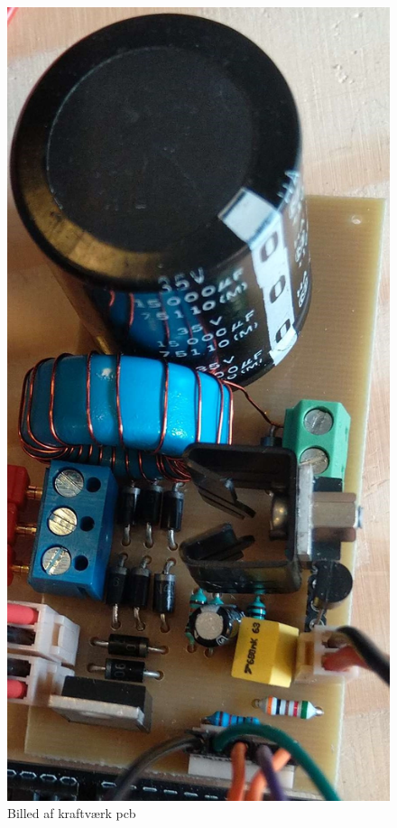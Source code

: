 \documentclass[../main.tex]{subfiles}
\begin{document}
\begin{figure}[H]
      \includegraphics[scale = 0.2]{Dokumentation/Pictures/PCB_kraft.jpg}
     \caption{Billed af kraftværk pcb}
     \label{fig: Kraftverk_pcb}
\end{figure}
\end{document}
